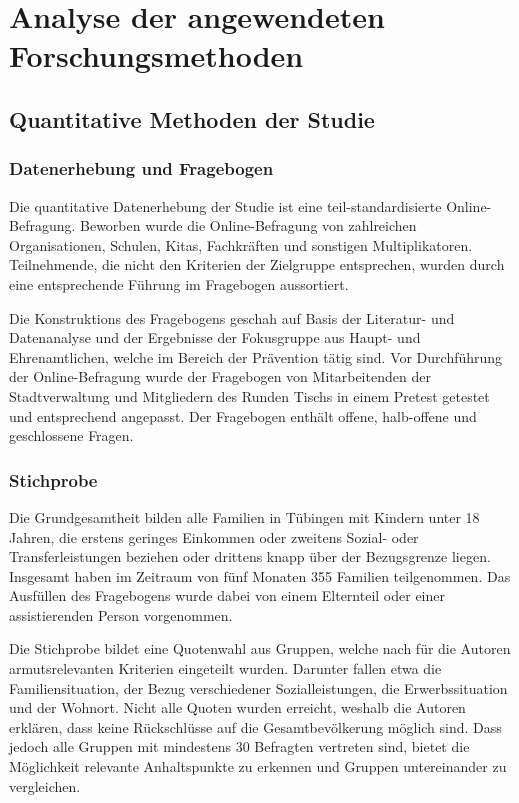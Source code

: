 \section{Analyse der angewendeten Forschungsmethoden}

\subsection{Quantitative Methoden der Studie}

\subsubsection{Datenerhebung und Fragebogen}

Die quantitative Datenerhebung der Studie ist eine teil-standardisierte Online-Befragung. Beworben wurde die Online-Befragung von zahlreichen Organisationen, Schulen, Kitas, Fachkräften und sonstigen Multiplikatoren. Teilnehmende, die nicht den Kriterien der Zielgruppe entsprechen, wurden durch eine entsprechende Führung im Fragebogen aussortiert.

Die Konstruktions des Fragebogens geschah auf Basis der Literatur- und Datenanalyse und der Ergebnisse der Fokusgruppe aus Haupt- und Ehrenamtlichen, welche im Bereich der Prävention tätig sind. Vor Durchführung der Online-Befragung wurde der Fragebogen von Mitarbeitenden der Stadtverwaltung und Mitgliedern des Runden Tischs in einem Pretest getestet und entsprechend angepasst. Der Fragebogen enthält offene, halb-offene und geschlossene Fragen.

\subsubsection{Stichprobe}

Die Grundgesamtheit bilden alle Familien in Tübingen mit Kindern unter 18 Jahren, die erstens geringes Einkommen oder zweitens Sozial- oder Transferleistungen beziehen oder drittens knapp über der Bezugsgrenze liegen. Insgesamt haben im Zeitraum von fünf Monaten 355 Familien teilgenommen. Das Ausfüllen des Fragebogens wurde dabei von einem Elternteil oder einer assistierenden Person vorgenommen.

Die Stichprobe bildet eine Quotenwahl aus Gruppen, welche nach für die Autoren armutsrelevanten Kriterien eingeteilt wurden. Darunter fallen etwa die Familiensituation, der Bezug verschiedener Sozialleistungen, die Erwerbssituation und der Wohnort. Nicht alle Quoten wurden erreicht, weshalb die Autoren erklären, dass keine Rückschlüsse auf die Gesamtbevölkerung möglich sind. Dass jedoch alle Gruppen mit mindestens 30 Befragten vertreten sind, bietet die Möglichkeit relevante Anhaltspunkte zu erkennen und Gruppen untereinander zu vergleichen.

